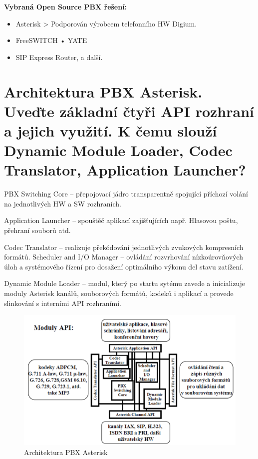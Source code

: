 \noindent\textbf{Vybraná Open Source PBX řešení:}
\begin{itemize}[noitemsep]
    \item Asterisk > Podporován výrobcem telefonního HW Digium.
    \item FreeSWITCH • YATE
    \item SIP Express Router, a další.
\end{itemize}

\section{Architektura PBX Asterisk. Uveďte základní čtyři API rozhraní a jejich využití. K čemu slouží Dynamic Module Loader, Codec Translator, Application Launcher?}

PBX Switching Core -- přepojovací jádro transparentně spojující příchozí volání na jednotlivých HW a SW rozhraních.

Application Launcher -- spouštěč aplikací zajišťujících např. Hlasovou poštu, přehraní souborů atd.

Codec Translator -- realizuje překódování jednotlivých zvukových kompresních formátů.
Scheduler and I/O Manager -- ovládání rozvrhování nízkoúrovňových úloh a systémového řízení pro dosažení optimálního výkonu del stavu zatížení.

Dynamic Module Loader -- modul, který po startu sytému zavede a inicializuje moduly Asterisk kanálů, souborových formátů, kodeků i aplikací a provede slinkování s interními API rozhraními.

\begin{figure}[h!]
    \begin{center}
        \includegraphics[width=\textwidth]{images/otazka8.png}
        \caption{Architektura PBX Asterisk}
        \label{img:3}
    \end{center}
\end{figure}

